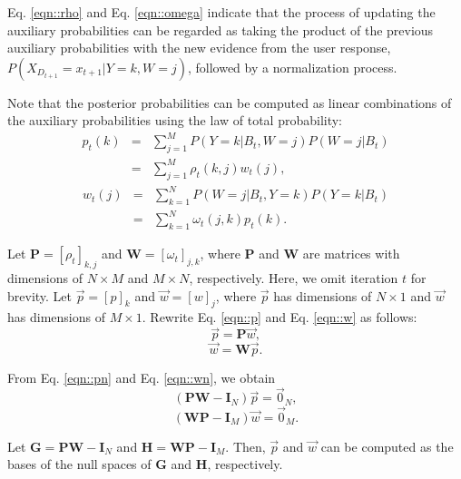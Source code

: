 \documentclass[journal]{IEEEtran}
\begin{document}
Eq. \eqref{eqn::rho} and Eq. \eqref{eqn::omega} indicate that the process of updating the auxiliary probabilities can be regarded as taking the product of the previous auxiliary probabilities with the new evidence from the user response, $P(X_{D_{t+1}}=x_{t+1}|Y=k,W=j)$, followed by a normalization process.

Note that the posterior probabilities can be computed as linear combinations of the auxiliary probabilities using the law of total probability:
\begin{eqnarray}\label{eqn::p}
p_t(k)&=&\sum_{j=1}^M P(Y=k|B_t,W=j)P(W=j|B_t) \nonumber\\
&=&\sum_{j=1}^M \rho_t(k,j)w_t(j),
\end{eqnarray}\vspace{-2ex}
\begin{eqnarray}\label{eqn::w}
w_t(j)&=&\sum_{k=1}^N P(W=j|B_t,Y=k)P(Y=k|B_t) \nonumber\\
&=&\sum_{k=1}^N \omega_t(j,k)p_t(k).
\end{eqnarray}

Let $\textbf{P}=[\rho_t]_{k,j}$ and $\textbf{W}=[\omega_t ]_{j,k}$, where $\textbf{P}$ and $\textbf{W}$ are matrices with dimensions of $N\times M$ and $M\times N$, respectively. Here, we omit iteration $t$ for brevity. Let $\vec{p}=[p]_{k}$ and $\vec{w}=[w]_j$, where $\vec{p}$ has dimensions of $N\times 1$ and $\vec{w}$ has dimensions of $M\times 1$.
Rewrite Eq. \eqref{eqn::p} and Eq. \eqref{eqn::w} as follows:
\begin{equation}\label{eqn::pn}
\vec{p} = \textbf{P} \vec{w},
\end{equation}
\begin{equation}\label{eqn::wn}
\vec{w} = \textbf{W} \vec{p}.
\end{equation}

From Eq. \eqref{eqn::pn} and Eq. \eqref{eqn::wn}, we obtain
\begin{equation}\label{eqn::solvep}
(\textbf{P} \textbf{W} - \textbf{I}_N) \vec{p}=\vec{0}_N,
\end{equation}
\begin{equation}\label{eqn::solvew}
(\textbf{W} \textbf{P} - \textbf{I}_M) \vec{w}=\vec{0}_M.
\end{equation}

Let $\textbf{G}=\textbf{P} \textbf{W} - \textbf{I}_N$ and $\textbf{H}=\textbf{W} \textbf{P} - \textbf{I}_M$. Then, $\vec{p}$ and $\vec{w}$ can be computed as the bases of the null spaces of $\textbf{G}$ and $\textbf{H}$, respectively.
\end{document}
